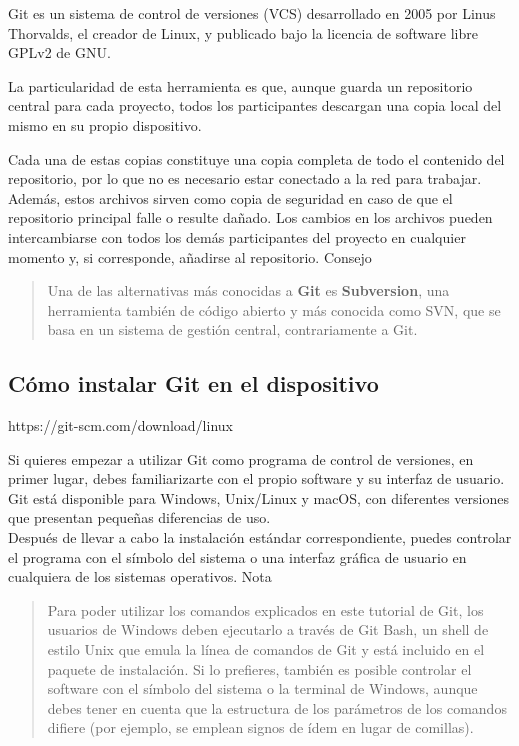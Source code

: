 \documentclass[11pt]{article}
\begin{document}
Git es un sistema de control de versiones (VCS) desarrollado en 2005 por
Linus Thorvalds, el creador de Linux, y publicado bajo la licencia de
software libre GPLv2 de GNU.

La particularidad de esta herramienta es que, aunque guarda un
repositorio central para cada proyecto, todos los participantes
descargan una copia local del mismo en su propio dispositivo.

Cada una de estas copias constituye una copia completa de todo el
contenido del repositorio, por lo que no es necesario estar conectado a
la red para trabajar. Además, estos archivos sirven como copia de
seguridad en caso de que el repositorio principal falle o resulte
dañado. Los cambios en los archivos pueden intercambiarse con todos los
demás participantes del proyecto en cualquier momento y, si corresponde,
añadirse al repositorio. Consejo

\begin{quote}
Una de las alternativas más conocidas a \textbf{Git} es
\textbf{Subversion}, una herramienta también de código abierto y más
conocida como SVN, que se basa en un sistema de gestión central,
contrariamente a Git.
\end{quote}

    \hypertarget{cuxf3mo-instalar-git-en-el-dispositivo}{%
\subsection{Cómo instalar Git en el
dispositivo}\label{cuxf3mo-instalar-git-en-el-dispositivo}}

https://git-scm.com/download/linux

Si quieres empezar a utilizar Git como programa de control de versiones,
en primer lugar, debes familiarizarte con el propio software y su
interfaz de usuario.\\
Git está disponible para Windows, Unix/Linux y macOS, con diferentes
versiones que presentan pequeñas diferencias de uso.\\
Después de llevar a cabo la instalación estándar correspondiente, puedes
controlar el programa con el símbolo del sistema o una interfaz gráfica
de usuario en cualquiera de los sistemas operativos. Nota

\begin{quote}
Para poder utilizar los comandos explicados en este tutorial de Git, los
usuarios de Windows deben ejecutarlo a través de Git Bash, un shell de
estilo Unix que emula la línea de comandos de Git y está incluido en el
paquete de instalación. Si lo prefieres, también es posible controlar el
software con el símbolo del sistema o la terminal de Windows, aunque
debes tener en cuenta que la estructura de los parámetros de los
comandos difiere (por ejemplo, se emplean signos de ídem en lugar de
comillas).
\end{quote}
\end{document}

